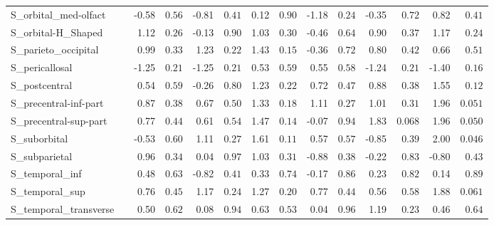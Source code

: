 {\begin{longtable}{llrrrrrrrrrrrr}
S\_orbital\_med-olfact &  & -0.58 & $0.56$ & -0.81 & $0.41$ & 0.12 & $0.90$ & -1.18 & $0.24$ & -0.35 & $0.72$ & 0.82 & $0.41$ \\
S\_orbital-H\_Shaped &  & 1.12 & $0.26$ & -0.13 & $0.90$ & 1.03 & $0.30$ & -0.46 & $0.64$ & 0.90 & $0.37$ & 1.17 & $0.24$ \\
S\_parieto\_occipital &  & 0.99 & $0.33$ & 1.23 & $0.22$ & 1.43 & $0.15$ & -0.36 & $0.72$ & 0.80 & $0.42$ & 0.66 & $0.51$ \\
S\_pericallosal &  & -1.25 & $0.21$ & -1.25 & $0.21$ & 0.53 & $0.59$ & 0.55 & $0.58$ & -1.24 & $0.21$ & -1.40 & $0.16$ \\
S\_postcentral &  & 0.54 & $0.59$ & -0.26 & $0.80$ & 1.23 & $0.22$ & 0.72 & $0.47$ & 0.88 & $0.38$ & 1.55 & $0.12$ \\
S\_precentral-inf-part &  & 0.87 & $0.38$ & 0.67 & $0.50$ & 1.33 & $0.18$ & 1.11 & $0.27$ & 1.01 & $0.31$ & 1.96 & $0.051$ \\
S\_precentral-sup-part &  & 0.77 & $0.44$ & 0.61 & $0.54$ & 1.47 & $0.14$ & -0.07 & $0.94$ & 1.83 & $0.068$ & 1.96 & $0.050$ \\
S\_suborbital &  & -0.53 & $0.60$ & 1.11 & $0.27$ & 1.61 & $0.11$ & 0.57 & $0.57$ & -0.85 & $0.39$ & 2.00 & $0.046$ \\
S\_subparietal &  & 0.96 & $0.34$ & 0.04 & $0.97$ & 1.03 & $0.31$ & -0.88 & $0.38$ & -0.22 & $0.83$ & -0.80 & $0.43$ \\
S\_temporal\_inf &  & 0.48 & $0.63$ & -0.82 & $0.41$ & 0.33 & $0.74$ & -0.17 & $0.86$ & 0.23 & $0.82$ & 0.14 & $0.89$ \\
S\_temporal\_sup &  & 0.76 & $0.45$ & 1.17 & $0.24$ & 1.27 & $0.20$ & 0.77 & $0.44$ & 0.56 & $0.58$ & 1.88 & $0.061$ \\
S\_temporal\_transverse &  & 0.50 & $0.62$ & 0.08 & $0.94$ & 0.63 & $0.53$ & 0.04 & $0.96$ & 1.19 & $0.23$ & 0.46 & $0.64$ \\
\end{longtable}}
